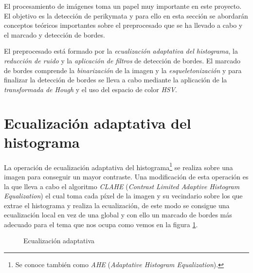 \label{ConceptosTeoricos}

El procesamiento de imágenes toma un papel muy importante en este proyecto. El objetivo es la detección de perikymata y para ello en esta sección se abordarán conceptos teóricos importantes sobre el preprocesado que se ha llevado a cabo y el marcado y detección de bordes.

El preprocesado está formado por la \textit{ecualización adaptativa del histograma}, la \textit{reducción de ruido} y la \textit{aplicación de filtros} de detección de bordes. El marcado de bordes comprende la \textit{binarización} de la imagen y la \textit{esqueletonización} y para finalizar la detección de bordes se lleva a cabo mediante la aplicación de la \textit{transformada de Hough} y el uso del espacio de color \textit{HSV}.

\section{Ecualización adaptativa del histograma}
\label{EcualizacionAdaptativa}
La operación de ecualización adaptativa del histograma\footnote{Se conoce también como \textit{AHE} (\textit{Adaptative Histogram Equalization}).}  se realiza sobre una imagen para conseguir un mayor contraste. Una modificación de esta operación es la que lleva a cabo el algoritmo \textit{CLAHE} \cite{wiki:CLAHE} (\textit{Contrast Limited Adaptive Histogram Equalization}) el cual toma cada píxel de la imagen y su vecindario sobre los que extrae el histograma y realiza la ecualización, de este modo se consigue una ecualización local en vez de una global y con ello un marcado de bordes más adecuado para el tema que nos ocupa como vemos en la figura \ref{LennaEqua}.

\begin{figure}[H]
\centering
{}
\caption{Ecualización adaptativa}
\label{LennaEqua}
\end{figure}

